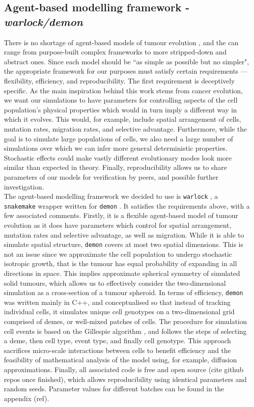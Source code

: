 \subsection{Agent-based modelling framework - \textit{warlock/demon}}
There is no shortage of agent-based models of tumour evolution
\cite{colyer_seven-step_2023}, and the can range from purpose-built complex
frameworks to more stripped-down and abstract ones. Since each model should be
``as simple as possible but no simpler", the appropriate framework for our
purposes must satisfy certain requirements --- flexibility, efficiency, and
reproducibility. The first requirement is deceptively specific. As the main
inspiration behind this work stems from cancer evolution, we want our
simulations to have parameters for controlling aspects of the cell population's
physical properties which would in turn imply a different way in which it
evolves. This would, for example, include spatial arrangement of cells, mutation
rates, migration rates, and selective advantage. Furthermore, while the goal is
to simulate large populations of cells, we also need a large number of
simulations over which we can infer more general deterministic properties.
Stochastic effects could make vastly different evolutionary modes look more
similar than expected in theory. Finally, reproducibility allows us to share
parameters of our models for verification by peers, and possible further
investigation.\\
The agent-based modelling framework we decided to use is \texttt{warlock}
\cite{bak_warlock_2023}, a \texttt{snakemake} wrapper written for \texttt{demon}
\cite{noble_demon_2020}. It satisfies the requirements above, with a few
associated comments. Firstly, it is a flexible agent-based model of tumour
evolution as it does have parameters which control for spatial arrangement,
mutation rates and selective advantage, as well as migration. While it is able
to simulate spatial structure, \texttt{demon} covers at most two spatial
dimensions. This is not an issue since we approximate the cell population to
undergo stochastic isotropic growth, that is the tumour has equal probability of
expanding in all directions in space. This implies approximate spherical
symmetry of simulated solid tumours, which allows us to effectively consider the
two-dimensional simulation as a cross-section of a tumour spheroid. In terms of
efficiency, \texttt{demon} was written mainly in C++, and conceptualised so that
instead of tracking individual cells, it simulates unique cell genotypes on a
two-dimensional grid comprised of demes, or well-mixed patches of cells. The
procedure for simulation cell events is based on the Gillespie algorithm
\cite{gillespie_exact_1977}, and follows the steps of selecting a deme, then
cell type, event type, and finally cell genotype. This approach sacrifices
micro-scale interactions between cells to benefit efficiency and the feasibility
of mathematical analysis of the model using, for example, diffusion
approximations. Finally, all associated code is free and open source (cite
github repos once finished), which allows reproducibility using identical
parameters and random seeds. Parameter values for different batches can be found
in the appendix (ref).


